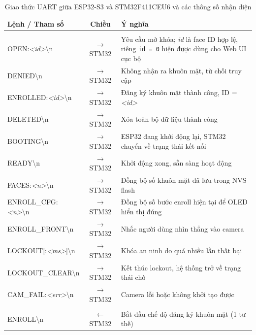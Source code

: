 \begin{table}[htbp]
  \centering
  \small
  \caption{Giao thức UART giữa ESP32-S3 và STM32F411CEU6 và các thông số nhận diện}
  \label{tab:uart_protocol}
  \begin{tabularx}{\textwidth}{>{\ttfamily\raggedright\arraybackslash}p{4.9cm} c Y}
    \toprule
    \textbf{Lệnh / Tham số} & \textbf{Chiều} & \textbf{Ý nghĩa} \\
    \midrule
     \\
    OPEN:\textit{<id>}\textbackslash n     & $\to$ STM32 & Yêu cầu mở khóa; \textit{id} là face ID hợp lệ, riêng \texttt{id = 0} hiện được dùng cho Web UI cục bộ \\
    DENIED\textbackslash n                 & $\to$ STM32 & Không nhận ra khuôn mặt, từ chối truy cập \\
    ENROLLED:\textit{<id>}\textbackslash n & $\to$ STM32 & Đăng ký khuôn mặt thành công, ID = \textit{<id>} \\
    DELETED\textbackslash n                & $\to$ STM32 & Xóa toàn bộ dữ liệu thành công \\
    BOOTING\textbackslash n                & $\to$ STM32 & ESP32 đang khởi động lại, STM32 chuyển về trạng thái kết nối \\
    READY\textbackslash n                  & $\to$ STM32 & Khởi động xong, sẵn sàng hoạt động \\
    FACES:\textit{<n>}\textbackslash n     & $\to$ STM32 & Đồng bộ số khuôn mặt đã lưu trong NVS flash \\
    ENROLL\_CFG:\textit{<n>}\textbackslash n & $\to$ STM32 & Đồng bộ số bước enroll hiện tại để OLED hiển thị đúng \\
    ENROLL\_FRONT\textbackslash n          & $\to$ STM32 & Nhắc người dùng nhìn thẳng vào camera \\
    LOCKOUT[:\textit{<ms>}]\textbackslash n & $\to$ STM32 & Khóa an ninh do quá nhiều lần thất bại \\
    LOCKOUT\_CLEAR\textbackslash n         & $\to$ STM32 & Kết thúc lockout, hệ thống trở về trạng thái chờ \\
    CAM\_FAIL:\textit{<err>}\textbackslash n & $\to$ STM32 & Camera lỗi hoặc không khởi tạo được \\
    \midrule
     \\
    ENROLL\textbackslash n                 & $\leftarrow$ STM32 & Bắt đầu chế độ đăng ký khuôn mặt (1 tư thế) \\

\end{tabularx}
\end{table}
